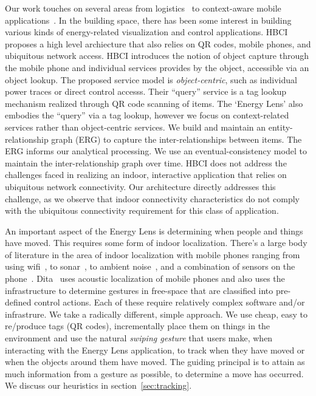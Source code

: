 Our work touches on several areas from logistics~\cite{rfid_gonz2006} 
to context-aware 
mobile applications~\cite{ACE}.  
In the building space, there has been
some interest in building various kinds of energy-related visualization and control applications.
HBCI~\cite{hbci} proposes a high level archiecture that also relies on QR codes, mobile phones, and ubiquitous network access.  HBCI introduces 
the notion of object capture through 
the mobile phone and  individual services provides by the object, accessible via an object lookup.  The proposed service model is 
\emph{object-centric}, such as individual power traces or direct control accesss.  Their ``query'' service is a tag lookup mechanism realized through
 QR code scanning of items.  The `Energy Lens' also embodies the ``query'' via a tag lookup, however 
we focus on context-related services rather than object-centric services.  We build and maintain an entity-relationship graph (ERG) to
capture the inter-relationships between items.  The ERG informs our analytical processing.  We use an eventual-consistency model to 
maintain the inter-relationship graph over time.  HBCI does not address the challenges faced in realizing an indoor, interactive application 
that relies on ubiquitous network connectivity.  Our architecture directly addresses this challenge, as we observe that indoor connectivity characteristics do 
not comply with the ubiquitous connectivity requirement for this class of application.


An important aspect of the Energy Lens is determining when people and things have moved.  This requires some form 
of indoor localization.  There's a large body of literature in the area of indoor localization with mobile phones ranging from 
using wifi~\cite{radar}, to sonar~\cite{cricket}, to ambient noise~\cite{abs}, and a combination of sensors on the 
phone~\cite{surroundsense}.  Dita~\cite{dita} uses acoustic localization of mobile phones and also uses the infrastructure 
to determine gestures in free-space that are classified into pre-defined control actions.  Each of these require relatively complex 
software and/or infrastrure.  
We take a radically different, simple approach.  We use cheap, easy to re/produce tags (QR codes), incrementally place them on things in the 
environment and use the natural \emph{swiping gesture} that users make, when interacting with the Energy Lens 
application, to track when they have moved or when the objects around them have moved.  The guiding principal is to attain as much 
information from a gesture as possible, to determine a move has occurred.  We discuss our heuristics in section~\ref{sec:tracking}.

